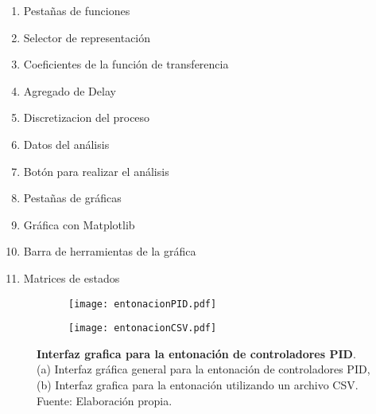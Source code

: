     \begin{multicols}{2}
        \begin{enumerate}[leftmargin=20pt]
            \item Pestañas de funciones
            \item Selector de representación
            \item Coeficientes de la función de transferencia
            \item Agregado de Delay
            \item Discretizacion del proceso
            \item Datos del análisis
            \item Botón para realizar el análisis
            \item Pestañas de gráficas
            \item Gráfica con Matplotlib
            \item Barra de herramientas de la gráfica
            \item Matrices de estados
        \end{enumerate}
    \end{multicols}


    \begin{figure}[h!]
        \centering
        \begin{subfigure}[t]{\textwidth}
            \centering
            \texttt{[image: entonacionPID.pdf]}
            \caption{}
            \label{fig:interfazentonacionPID}
        \end{subfigure}
        \hfill
        \begin{subfigure}[t]{\textwidth}
            \centering
            \texttt{[image: entonacionCSV.pdf]}
            \caption{}
            \label{fig:interfazentonacionCSV}
        \end{subfigure}
        \caption[Interfaz grafica para la entonación de controladores PID]{\textbf{Interfaz grafica para la entonación de controladores PID}. (a) Interfaz gráfica general para la entonación de controladores PID, (b) Interfaz grafica para la entonación utilizando un archivo CSV. Fuente: Elaboración propia. \label{fig:interfazentonacion}}
    \end{figure}

